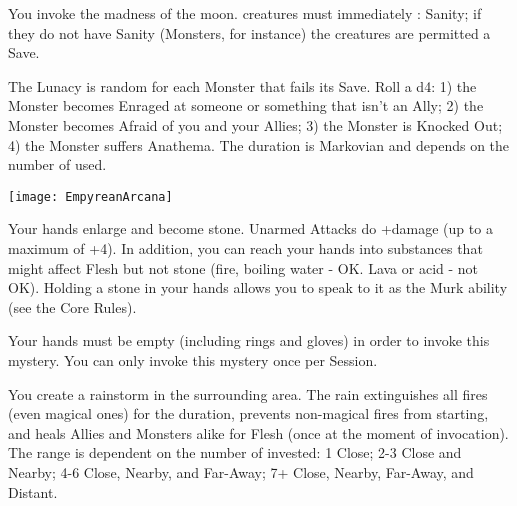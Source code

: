 {\MYSTERY [
  Name = Lunacy,
  Link = arcana-mystery-lunacy,
  Paradigm = Mind,
  Save = Y (neg.),
  Duration = Markovian,
  Target = Close or Nearby Target(s)
]

You invoke the madness of the moon.  \DICE creatures must immediately \RS : Sanity; if they do not have Sanity (Monsters, for instance) the creatures are permitted a Save.

The Lunacy is random for each Monster that fails its Save.  Roll a d4:  1) the Monster becomes Enraged at someone or something that isn't an Ally; 2) the Monster becomes Afraid of you and your Allies; 3) the Monster is Knocked Out; 4) the Monster suffers Anathema.  The duration is Markovian and depends on the number of \DICE used.

  \begin{center}
  \texttt{[image: EmpyreanArcana]}
  \end{center}


\MYSTERY [
  Name = Mountainhands,
  Link = arcana-mystery-mountainhands,
  Paradigm = Biomancy,
  Save = N,
  Duration = Session,
  Target = Self
]

Your hands enlarge and become stone.  Unarmed Attacks do +\DICE damage (up to a maximum of +4).  In addition, you can reach your hands into substances that might affect Flesh but not stone (fire, boiling water - OK.  Lava or acid - not OK).  Holding a stone in your hands allows you to speak to it as the Murk ability (see the Core Rules). 

Your hands must be empty (including rings and gloves) in order to invoke this mystery. You can only invoke this mystery once per Session.

\MYSTERY [
  Name = Rainburst,
  Link = arcana-mystery-rainburst,
  Paradigm = Elements,
  Save = n/a,
  Duration = Combat or \SUM Minutes,
  Target = See Below
]

You create a rainstorm in the surrounding area.  The rain extinguishes all fires (even magical ones) for the duration, prevents non-magical fires from starting, and heals Allies and Monsters alike for \SUMDICE Flesh (once at the moment of invocation).  The range is dependent on the number of \DICE invested: 1 Close; 2-3 Close and Nearby; 4-6 Close, Nearby, and Far-Away; 7+ Close, Nearby, Far-Away, and Distant.

\MYSTERY [
  Name = Resonating Command,
  Link = arcana-mystery-resonating-command,
  Paradigm = Mind,
  Save = Y (neg.),
  Duration = Markovian,
  Target = Nearby Target(s)
]

}
